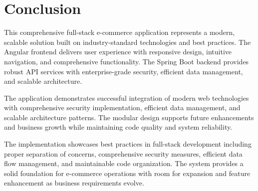 \documentclass[12pt,a4paper]{article}
\begin{document}
\section{Conclusion}

This comprehensive full-stack e-commerce application represents a modern, scalable solution built on industry-standard technologies and best practices. The Angular frontend delivers user experience with responsive design, intuitive navigation, and comprehensive functionality. The Spring Boot backend provides robust API services with enterprise-grade security, efficient data management, and scalable architecture.

The application demonstrates successful integration of modern web technologies with comprehensive security implementation, efficient data management, and scalable architecture patterns. The modular design supports future enhancements and business growth while maintaining code quality and system reliability.

The implementation showcases best practices in full-stack development including proper separation of concerns, comprehensive security measures, efficient data flow management, and maintainable code organization. The system provides a solid foundation for e-commerce operations with room for expansion and feature enhancement as business requirements evolve.
\end{document}
